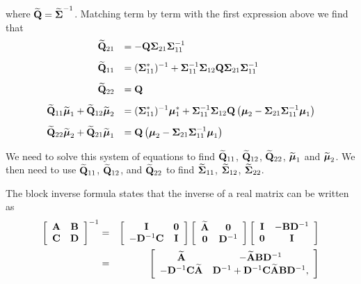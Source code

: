 \documentclass[12pt]{article}
\begin{document}
\begin{enumerate}
    \noindent where $\widetilde{{\bf Q}} = \widetilde{{\boldsymbol \Sigma}}^{-1}$. Matching term by term with the first expression above we find that
    $$
    \begin{array}{rl}
    \widetilde{{\bf Q}}_{21} & \displaystyle = -{\bf Q}{\boldsymbol \Sigma}_{21}{\boldsymbol \Sigma}_{11}^{-1}
    \\ [2ex]
    \widetilde{{\bf Q}}_{11} & \displaystyle =  ({\boldsymbol \Sigma}_{11}^*)^{-1}  + {\boldsymbol \Sigma}_{11}^{-1} {\boldsymbol \Sigma}_{12} {\bf Q}{\boldsymbol \Sigma}_{21}{\boldsymbol \Sigma}_{11}^{-1} 
    \\ [2ex]
    \widetilde{{\bf Q}}_{22} & \displaystyle = {\bf Q}
    \\ [2ex]
    \widetilde{{\bf Q}}_{11}\widetilde{{\boldsymbol \mu}}_1 + \widetilde{{\bf Q}}_{12}\widetilde{{\boldsymbol \mu}}_2
    & \displaystyle =  
     ({\boldsymbol \Sigma}_{11}^*)^{-1} {\boldsymbol \mu}_1^* + {\boldsymbol \Sigma}_{11}^{-1}{\boldsymbol \Sigma}_{12}{\bf Q} \left(  
    {\boldsymbol \mu}_2 - {\boldsymbol \Sigma}_{21}{\boldsymbol \Sigma}_{11}^{-1}{\boldsymbol \mu}_1\right) 
    \\ [2ex]
    \widetilde{{\bf Q}}_{22}\widetilde{{\boldsymbol \mu}}_2 + \widetilde{{\bf Q}}_{21}\widetilde{{\boldsymbol \mu}}_1
    & \displaystyle = {\bf Q}\left( {\boldsymbol \mu}_2 - {\boldsymbol \Sigma}_{21}{\boldsymbol \Sigma}_{11}^{-1}{\boldsymbol \mu}_1\right) 
    \end{array} 
    $$
    
    \noindent We need to solve this system of equations to find
    $\widetilde{{\bf Q}}_{11}$, $\widetilde{{\bf Q}}_{12}$, $\widetilde{{\bf Q}}_{22}$, $\widetilde{{\boldsymbol \mu}}_1$
    and $\widetilde{{\boldsymbol \mu}}_2$. We then need to use 
    $\widetilde{{\bf Q}}_{11}$, $\widetilde{{\bf Q}}_{12}$, and $\widetilde{{\bf Q}}_{22}$
    to find
    $\widetilde{{\boldsymbol \Sigma}}_{11}$, $\widetilde{{\boldsymbol \Sigma}}_{12}$, $\widetilde{{\boldsymbol \Sigma}}_{22}$.

    
    The block inverse formula states that the inverse of a real matrix can be written as
		\begin{eqnarray}
		\displaystyle \left[ \begin{array}{cc}
		{\bf A}   & {\bf B} \\
		{\bf C} & {\bf D}
		\end{array} \right]^{-1}
		&  = &
		\displaystyle \left[ \begin{array}{cc}
		{\bf I} & {\bf 0} \\
		-{\bf D}^{-1}{\bf C} &  {\bf I}
		\end{array} \right]
		\left[ \begin{array}{cc}
		\widetilde{{\bf A}} & {\bf 0} \\
		{\bf 0} & {\bf D}^{-1}
		\end{array} \right]
		\left[ \begin{array}{cc}
		{\bf I}    & -{\bf B}{\bf D}^{-1}\\
		{\bf 0} & {\bf I}
		\end{array} \right] \label{eq:blockdiag1}\\
		&  = &
		\displaystyle\left[
		\begin{array}{cc}
		\widetilde{{\bf A}}
		& - \widetilde{{\bf A}}{\bf B}{\bf D}^{-1} \\
		-{\bf D}^{-1}{\bf C}\widetilde{{\bf A}}
		& {\bf D}^{-1} + {\bf D}^{-1}{\bf C}\widetilde{{\bf A}}{\bf B}{\bf D}^{-1},
		\end{array}\right]\label{eq:blockdiag2}
		\end{eqnarray}
		

\end{enumerate}
\end{document}
